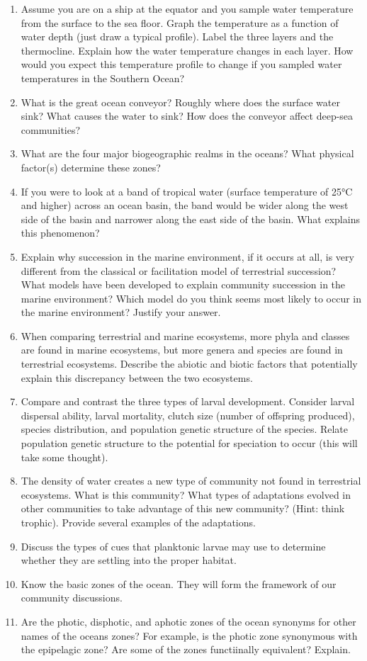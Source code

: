 \documentclass[nofonts, letterpaper]{tufte-handout}
\begin{document}
\begin{enumerate}
\item
  Assume you are on a ship at the equator and you sample water
  temperature from the surface to the sea floor. Graph the temperature
  as a function of water depth (just draw a typical profile). Label the
  three layers and the thermocline. Explain how the water temperature
  changes in each layer. How would you expect this temperature profile
  to change if you sampled water temperatures in the Southern Ocean?
\item
  What is the great ocean conveyor? Roughly where does the surface water
  sink? What causes the water to sink? How does the conveyor affect
  deep-sea communities?
\item
  What are the four major biogeographic realms in the oceans? What
  physical factor(s) determine these zones?
\item
  If you were to look at a band of tropical water (surface temperature
  of 25°C and higher) across an ocean basin, the band would be wider
  along the west side of the basin and narrower along the east side of
  the basin. What explains this phenomenon?
\item
  Explain why succession in the marine environment, if it occurs at all,
  is very different from the classical or facilitation model of
  terrestrial succession? What models have been developed to explain
  community succession in the marine environment? Which model do you
  think seems most likely to occur in the marine environment? Justify
  your answer.
\item
  When comparing terrestrial and marine ecosystems, more phyla and
  classes are found in marine ecosystems, but more genera and species
  are found in terrestrial ecosystems. Describe the abiotic and biotic
  factors that potentially explain this discrepancy between the two
  ecosystems.
\item
  Compare and contrast the three types of larval development. Consider
  larval dispersal ability, larval mortality, clutch size (number of
  offspring produced), species distribution, and population genetic
  structure of the species. Relate population genetic structure to the
  potential for speciation to occur (this will take some thought).
\item
  The density of water creates a new type of community not found in
  terrestrial ecosystems. What is this community? What types of
  adaptations evolved in other communities to take advantage of this new
  community? (Hint: think trophic). Provide several examples of the
  adaptations.
\item
  Discuss the types of cues that planktonic larvae may use to determine
  whether they are settling into the proper habitat.
\item
  Know the basic zones of the ocean. They will form the framework of our
  community discussions.
\item
  Are the photic, disphotic, and aphotic zones of the ocean synonyms for
  other names of the oceans zones? For example, is the photic zone
  synonymous with the epipelagic zone? Are some of the zones
  functiinally equivalent? Explain.
  \end{enumerate}
\end{document}
